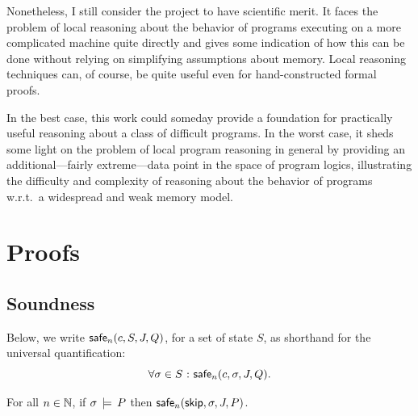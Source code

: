 \documentclass[11pt]{report}
\begin{document}
Nonetheless, I still consider the project to have scientific merit. It faces the problem of local reasoning about the behavior of programs executing on a more complicated machine quite directly and gives some indication of how this can be done without relying on simplifying assumptions about memory. Local reasoning techniques can, of course, be quite useful even for hand-constructed formal proofs. 

In the best case, this work could someday provide a foundation for practically useful reasoning about a class of difficult programs. In the worst case, it sheds some light on the problem of local program reasoning in general by providing an additional---fairly extreme---data point in the space of program logics, illustrating the difficulty and complexity of reasoning about the behavior of programs w.r.t.~a widespread and weak memory model. 



 

\appendix

\chapter{Proofs}

\section{Soundness}
\label{sec:soundness-proofs}
Below, we write $\mathsf{safe}_{n}(c,S,J,Q)$, for a set of state $S$, as shorthand for the universal quantification: \[ \forall \sigma \in S \operatorname{\,:\,} \mathsf{safe}_{n}(c,\sigma,J,Q).\]

\begin{lemma}
	\label{lem:skip-safe}
	For all $n \in \mathbb{N}$, if $\sigma \,\models\, P$ then $\mathsf{safe}_{n}(\operatorname{\mathsf{skip}},\sigma,J,P)$. 
\end{lemma}
\end{document}
